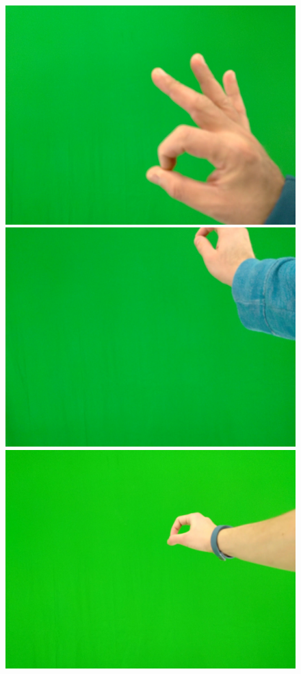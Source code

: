 \begin{figure}[htb]
\begin{minipage}[c]{0.19\linewidth}
      \includegraphics[width=0.95\linewidth]{figures/g2-11.jpg}
   \end{minipage} 
   \begin{minipage}[c]{0.19\linewidth}
      \includegraphics[width=0.95\linewidth]{figures/g2-13.jpg}
   \end{minipage}
   \begin{minipage}[c]{0.19\linewidth}
      \includegraphics[width=0.95\linewidth]{figures/g2-15.jpg}

\end{minipage}
\end{figure}
